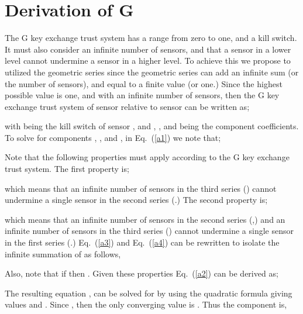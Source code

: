 \documentclass{ws-fnl2}
\begin{document}
\appendix

\section{Derivation of G}
 
 The G key exchange trust system has a range from zero to one, and a kill switch. It must also consider an infinite number of sensors, and that a sensor in a lower level cannot undermine a sensor in a higher level. To achieve this we propose to utilized the geometric series since the geometric series can add an infinite sum (or the number of sensors), and equal to a finite value (or one.) Since the highest possible value is one, and with an infinite number of sensors, then the G key exchange trust system of sensor  relative to sensor  can be written as;
\eject

\noindent

 


\noindent
with  being the kill switch of sensor , and , , and  being the component coefficients. To solve for components , , and , in Eq.~(\ref{a1}) we note that;


 


\noindent
Note that the following properties must apply according to the G key exchange trust system. The first property is;


 


\noindent
which means that an infinite number of sensors in the third series () cannot undermine a single sensor in the second series (.) The second property is;


 


\noindent
which means that an infinite number of sensors in the second series (,) and an infinite number of sensors in the third series () cannot undermine a single sensor in the first series (.) Eq.~(\ref{a3}) and Eq.~(\ref{a4}) can be rewritten to isolate the infinite summation of  as follows,





\noindent
Also, note that if  then . Given these properties Eq.~(\ref{a2}) can be derived as;




\noindent
The resulting equation , can be solved for  by using the quadratic formula giving values  and . Since , then the only converging value is . Thus the component  is,
\end{document}
